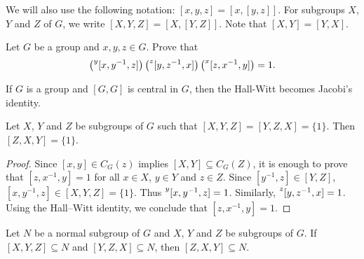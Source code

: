 We will also use the following notation:  
$[x,y,z]=[x,[y,z]]$. For subgroups $X$, $Y$ and $Z$ of $G$, we write 
$[X,Y,Z]=\left[ X,[Y,Z] \right]$. Note that $[X,Y]=[Y,X]$. 

\begin{exercise}
	\label{exercise:HallWitt}
	Let $G$ be a group and $x,y,z\in G$. Prove that 
	\begin{equation}
		\label{eq:HallWitt}
	\left(\prescript{y}{}[x,y^{-1},z]\right)\left(\prescript{z}{}[y,z^{-1},x]\right)\left(\prescript{x}{}[z,x^{-1},y]\right)=1.
	\end{equation}
\end{exercise}

If $G$ is a group and $[G,G]$ is central in $G$,
then the Hall-Witt becomes Jacobi's identity.

\begin{lemma}
	\label{lemma:3subgrupos}
	Let $X$, $Y$ and $Z$ be subgroups of $G$ 
 such that $[X,Y,Z]=[Y,Z,X]=\{1\}$.
	Then $[Z,X,Y]=\{1\}$.
\end{lemma}

\begin{proof}
Since $[x,y]\in C_G(z)$ implies $[X,Y]\subseteq C_G(Z)$, 
it is enough to prove that $[z,x^{-1},y]=1$ for all $x\in X$, $y\in Y$ and $z\in Z$. Since $[y^{-1},z]\in [Y,Z]$, $[x,y^{-1},z]\in [X,Y,Z]=\{1\}$. Thus $\prescript{y}{}[x,y^{-1},z]=1$. Similarly, $\prescript{z}{}[y,z^{-1},x]=1$. Using the Hall--Witt identity, we conclude that $[z,x^{-1},y]=1$.
\end{proof}

\begin{exercise}
\label{xca:3subgroups}
Let $N$ be a normal subgroup of $G$ and 
$X$, $Y$ and $Z$ be subgroups of $G$. If $[X,Y,Z]\subseteq N$ and $[Y,Z,X]\subseteq N$, then 
$[Z,X,Y]\subseteq N$.
\end{exercise}

